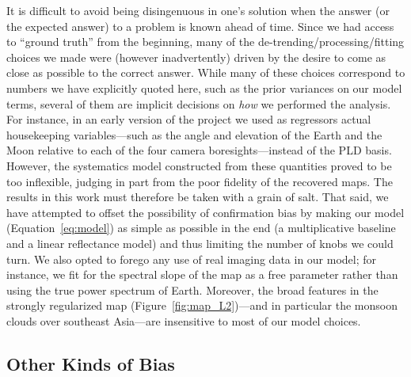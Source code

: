 \documentclass[modern]{aastex62}
\begin{document}
It is difficult to avoid being disingenuous in one's solution
when the answer (or the expected answer)
to a problem is known ahead of time. Since we had access to 
``ground truth'' from the beginning, many of the de-trending/processing/fitting
choices we made were (however inadvertently) driven by the desire to
come as close as possible to the correct answer. While many of these choices
correspond to numbers we have explicitly quoted here, such as the prior
variances on our model terms, several of them are implicit decisions on
\emph{how} we performed the analysis. For instance, in an early version of 
the project we used as regressors actual \TESS housekeeping variables---such as the angle 
and elevation of the Earth and the Moon relative to each of the four camera 
boresights---instead of the PLD basis. However, the systematics model constructed from these quantities
proved to be too inflexible, judging in part from the poor fidelity of the recovered
maps. The results in this work
must therefore be taken with a grain of salt. That said, we have attempted to
offset the possibility of confirmation bias by making our model
(Equation~\ref{eq:model}) as simple as possible in the end (a multiplicative baseline
and a linear reflectance model) and thus limiting
the number of knobs we could turn. We also opted to forego any use of 
real imaging data in our model; for instance, we fit for the spectral
slope of the map as a free parameter rather than using the true power spectrum 
of Earth. Moreover, the broad features in the strongly
regularized map (Figure~\ref{fig:map_L2})---and in particular the monsoon clouds
over southeast Asia---are insensitive to most of our model choices.

\subsection{Other Kinds of Bias}
\label{sec:bias}
\end{document}
